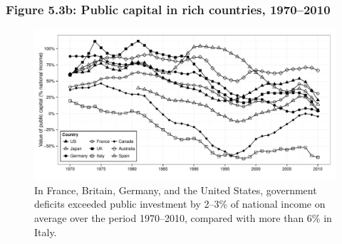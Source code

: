 \documentclass[t]{beamer}\usepackage[]{graphicx}\usepackage[]{color}
\newenvironment{knitrout}{}{} %
\begin{document}
\begin{frame}[label=Figure_5_3b]
\frametitle{Figure 5.3b: Public capital in rich countries, 1970--2010}
\begin{figure}[t]
\begin{minipage}[b]{\textwidth}
\centering
\begin{knitrout}\footnotesize
{}\color{fgcolor}

{\centering \includegraphics[width=1\linewidth]{figures/bw/Figure_5_3b} 

}



\end{knitrout}
\caption{In France, Britain, Germany, and the United States, government deficits exceeded public investment by 2--3\% of national income on average over the period 1970--2010, compared with more than 6\% in Italy.}
\end{minipage}
\end{figure}
\end{frame}
\end{document}
